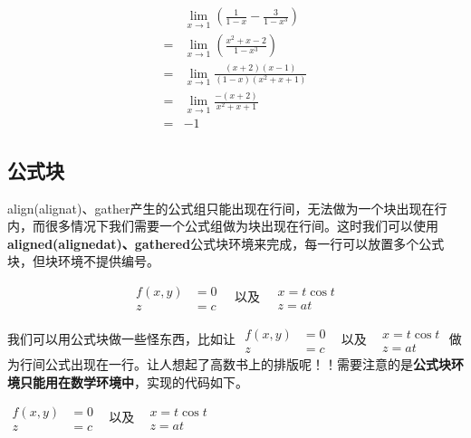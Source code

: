 \begin{equation}
\begin{split}
&\lim\limits_{x\to 1}\left(\frac{1}{1-x}-\frac{3}{1-x^3}\right)\\
= &\lim\limits_{x\to 1}\left(\frac{x^2+x-2}{1-x^3}\right)  \\
= & \lim\limits_{x\to 1}\frac{(x+2)(x-1)}{(1-x)(x^2+x+1)}\\
= & \lim\limits_{x\to 1}\frac{-(x+2)}{x^2+x+1}\\
= & -1
\end{split}
\end{equation}

\subsection{公式块}

align(alignat)、gather产生的公式组只能出现在行间，无法做为一个块出现在行内，而很多情况下我们需要一个公式组做为块出现在行间。这时我们可以使用\textbf{aligned(alignedat)、gathered}公式块环境来完成，每一行可以放置多个公式块，但块环境不提供编号。

\begin{codeshow}
\begin{equation}
\begin{aligned}
f(x,y) & =0 \\
z & =c
\end{aligned}
\quad \text{以及} \quad
\begin{gathered}
x=t\cos t \\
z=at
\end{gathered}
\end{equation}
\end{codeshow}

我们可以用公式块做一些怪东西，比如让
$\begin{aligned}f(x,y) & =0 \\z & =c\end{aligned}$
~以及~
$\begin{gathered}x=t\cos t \\z=at\end{gathered}$
做为行间公式出现在一行。让人想起了高数书上的排版呢！！需要注意的是\textbf{公式块环境只能用在数学环境中}，实现的代码如下。

\begin{latex}
$\begin{aligned}f(x,y) & =0 \\z & =c\end{aligned}$
~以及~
$\begin{gathered}x=t\cos t \\z=at\end{gathered}$
\end{latex}

